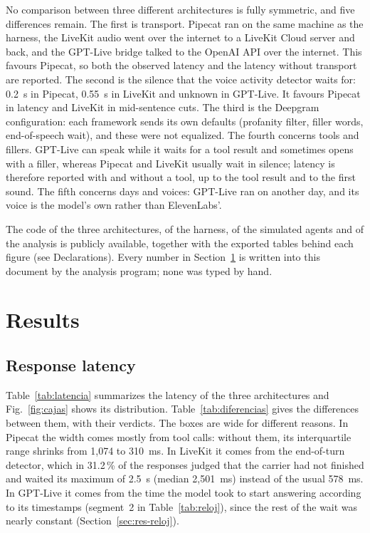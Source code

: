 \documentclass[11pt]{article}
\newcommand{\RDispIqrA}{1{,}074}
\newcommand{\RDispIqrSinHerrA}{310}
\newcommand{\RTramoFinCortoMedB}{578}
\newcommand{\RTramoFinLargoMedB}{2{,}501}
\newcommand{\RTramoFinLargoPctB}{31.2}
\begin{document}
No comparison between three different architectures is fully symmetric, and five differences remain.
The first is transport.
Pipecat ran on the same machine as the harness, the LiveKit audio went over the internet to a LiveKit Cloud server and back, and the GPT-Live bridge talked to the OpenAI API over the internet.
This favours Pipecat, so both the observed latency and the latency without transport are reported.
The second is the silence that the voice activity detector waits for: 0.2~s in Pipecat, 0.55~s in LiveKit and unknown in GPT-Live.
It favours Pipecat in latency and LiveKit in mid-sentence cuts.
The third is the Deepgram configuration: each framework sends its own defaults (profanity filter, filler words, end-of-speech wait), and these were not equalized.
The fourth concerns tools and fillers.
GPT-Live can speak while it waits for a tool result and sometimes opens with a filler, whereas Pipecat and LiveKit usually wait in silence; latency is therefore reported with and without a tool, up to the tool result and to the first sound.
The fifth concerns days and voices: GPT-Live ran on another day, and its voice is the model's own rather than ElevenLabs'.

The code of the three architectures, of the harness, of the simulated agents and of the analysis is publicly available, together with the exported tables behind each figure (see Declarations).
Every number in Section~\ref{sec:resultados} is written into this document by the analysis program; none was typed by hand.

\section{Results}\label{sec:resultados}

\subsection{Response latency}\label{sec:latencia}

Table~\ref{tab:latencia} summarizes the latency of the three architectures and
Fig.~\ref{fig:cajas} shows its distribution. Table~\ref{tab:diferencias} gives the
differences between them, with their verdicts.
The boxes are wide for different reasons.
In Pipecat the width comes mostly from tool calls: without them, its interquartile range shrinks from \RDispIqrA{} to \RDispIqrSinHerrA~ms.
In LiveKit it comes from the end-of-turn detector, which in \RTramoFinLargoPctB\,\% of the responses judged that the carrier had not finished and waited its maximum of 2.5~s (median \RTramoFinLargoMedB~ms) instead of the usual \RTramoFinCortoMedB~ms.
In GPT-Live it comes from the time the model took to start answering according to its timestamps (segment~2 in Table~\ref{tab:reloj}), since the rest of the wait was nearly constant (Section~\ref{sec:res-reloj}).
\end{document}
